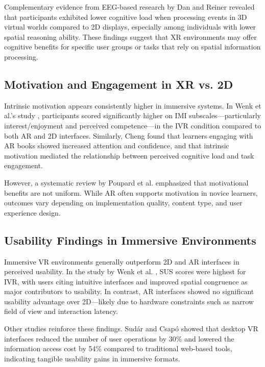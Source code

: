 \documentclass{CPP}
\begin{document}
Complementary evidence from EEG-based research by Dan and Reiner \citep{Dan2017} revealed that participants exhibited lower cognitive load when processing events in 3D virtual worlds compared to 2D displays, especially among individuals with lower spatial reasoning ability. These findings suggest that XR environments may offer cognitive benefits for specific user groups or tasks that rely on spatial information processing.

\subsection{Motivation and Engagement in XR vs. 2D}

Intrinsic motivation appears consistently higher in immersive systems. In Wenk et al.'s study \citep{Wenk2023}, participants scored significantly higher on IMI subscales—particularly interest/enjoyment and perceived competence—in the IVR condition compared to both AR and 2D interfaces. Similarly, Cheng \citep{Cheng2016} found that learners engaging with AR books showed increased attention and confidence, and that intrinsic motivation mediated the relationship between perceived cognitive load and task engagement.

However, a systematic review by Poupard et al. \citep{Poupard2024} emphasized that motivational benefits are not uniform. While AR often supports motivation in novice learners, outcomes vary depending on implementation quality, content type, and user experience design.

\subsection{Usability Findings in Immersive Environments}

Immersive VR environments generally outperform 2D and AR interfaces in perceived usability. In the study by Wenk et al. \citep{Wenk2023}, SUS scores were highest for IVR, with users citing intuitive interfaces and improved spatial congruence as major contributors to usability. In contrast, AR interfaces showed no significant usability advantage over 2D—likely due to hardware constraints such as narrow field of view and interaction latency.

Other studies reinforce these findings. Sudár and Csapó \citep{Sudar2024} showed that desktop VR interfaces reduced the number of user operations by 30\% and lowered the information access cost by 54\% compared to traditional web-based tools, indicating tangible usability gains in immersive formats.
\end{document}
